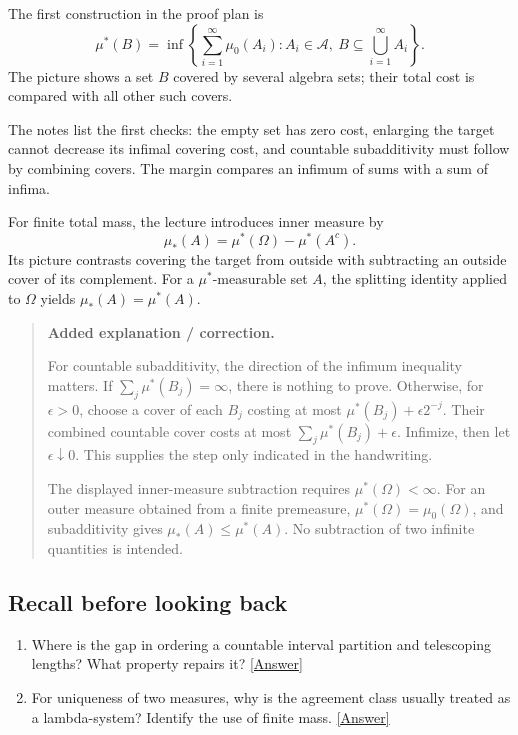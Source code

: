 \documentclass[11pt,letterpaper]{article}
\begin{document}
The first construction in the proof plan is \[\mu^*(B)=\inf\left\{\sum_{i=1}^{\infty}\mu_0(A_i):A_i\in\mathcal A,\ B\subseteq\bigcup_{i=1}^{\infty}A_i\right\}.\] The picture shows a set $B$ covered by several algebra sets; their total cost is compared with all other such covers.

The notes list the first checks: the empty set has zero cost, enlarging the target cannot decrease its infimal covering cost, and countable subadditivity must follow by combining covers. The margin compares an infimum of sums with a sum of infima.

For finite total mass, the lecture introduces inner measure by \[\mu_*(A)=\mu^*(\Omega)-\mu^*(A^c).\] Its picture contrasts covering the target from outside with subtracting an outside cover of its complement. For a $\mu^*$-measurable set $A$, the splitting identity applied to $\Omega$ yields $\mu_*(A)=\mu^*(A)$.

\begin{quote}\small\textbf{Added explanation / correction.}

For countable subadditivity, the direction of the infimum inequality matters. If $\sum_j\mu^*(B_j)=\infty$, there is nothing to prove. Otherwise, for $\epsilon>0$, choose a cover of each $B_j$ costing at most $\mu^*(B_j)+\epsilon2^{-j}$. Their combined countable cover costs at most $\sum_j\mu^*(B_j)+\epsilon$. Infimize, then let $\epsilon\downarrow0$. This supplies the step only indicated in the handwriting.

The displayed inner-measure subtraction requires $\mu^*(\Omega)<\infty$. For an outer measure obtained from a finite premeasure, $\mu^*(\Omega)=\mu_0(\Omega)$, and subadditivity gives $\mu_*(A)\le\mu^*(A)$. No subtraction of two infinite quantities is intended.
\end{quote}

\subsection*{Recall before looking back}
\begin{enumerate}
\item Where is the gap in ordering a countable interval partition and telescoping lengths? What property repairs it? \hyperlink{answer-l2-s2}{[Answer]}
\item For uniqueness of two measures, why is the agreement class usually treated as a lambda-system? Identify the use of finite mass. \hyperlink{answer-l2-s5}{[Answer]}
\end{enumerate}
\end{document}
